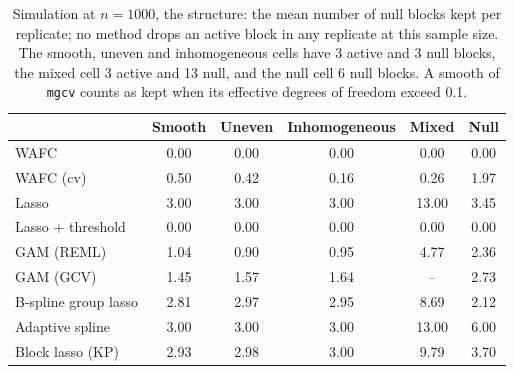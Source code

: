\begin{table}[tp]
\color{colR1}
\caption{Simulation at $n = 1000$, the structure: the mean number of null blocks kept per replicate; no method drops an active block in any replicate at this sample size. The smooth, uneven and inhomogeneous cells have 3 active and 3 null blocks, the mixed cell 3 active and 13 null, and the null cell 6 null blocks. A smooth of \texttt{mgcv} counts as kept when its effective degrees of freedom exceed 0.1.}
\label{tab:sim-structure}
\centering
\small
\setlength{\tabcolsep}{6pt}
\begin{tabular}{lccccc}
\hline
 & Smooth & Uneven & Inhomogeneous & Mixed & Null \\
\hline
WAFC & 0.00 & 0.00 & 0.00 & 0.00 & 0.00 \\
WAFC (cv) & 0.50 & 0.42 & 0.16 & 0.26 & 1.97 \\
Lasso & 3.00 & 3.00 & 3.00 & 13.00 & 3.45 \\
Lasso + threshold & 0.00 & 0.00 & 0.00 & 0.00 & 0.00 \\
GAM (REML) & 1.04 & 0.90 & 0.95 & 4.77 & 2.36 \\
GAM (GCV) & 1.45 & 1.57 & 1.64 & -- & 2.73 \\
B-spline group lasso & 2.81 & 2.97 & 2.95 & 8.69 & 2.12 \\
Adaptive spline & 3.00 & 3.00 & 3.00 & 13.00 & 6.00 \\
Block lasso (KP) & 2.93 & 2.98 & 3.00 & 9.79 & 3.70 \\
\hline
\end{tabular}
\end{table}

